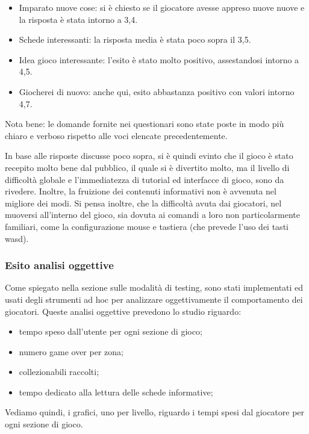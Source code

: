 \begin{itemize}
\item Imparato nuove cose: si è chiesto se il giocatore avesse appreso nuove nuove e la risposta è stata intorno a 3,4.
\item Schede interessanti: la risposta media è stata poco sopra il 3,5.
\item Idea gioco interessante: l'esito è stato molto positivo, assestandosi intorno a 4,5.
\item Giocherei di nuovo: anche qui, esito abbastanza positivo con valori intorno 4,7.

\end{itemize}

Nota bene: le domande fornite nei questionari sono state poste in modo più chiaro e verboso rispetto alle voci elencate precedentemente.

In base alle risposte discusse poco sopra, si è quindi evinto che il gioco è stato recepito molto bene dal pubblico, il quale si è divertito molto, ma il livello di difficoltà globale e l'immediatezza di tutorial ed interfacce di gioco, sono da rivedere. Inoltre, la fruizione dei contenuti informativi non è avvenuta nel migliore dei modi.
Si pensa inoltre, che la difficoltà avuta dai giocatori, nel muoversi all'interno del gioco, sia dovuta ai comandi a loro non particolarmente familiari, come la configurazione mouse e tastiera (che prevede l'uso dei tasti wasd).


\subsubsection{Esito analisi oggettive}

Come spiegato nella sezione sulle modalità di testing, sono stati implementati ed usati degli strumenti ad hoc per analizzare oggettivamente il comportamento dei giocatori.
Queste analisi oggettive prevedono lo studio riguardo:

\begin{itemize}

\item tempo speso dall'utente per ogni sezione di gioco;
\item numero game over per zona;
\item collezionabili raccolti;
\item tempo dedicato alla lettura delle schede informative;

\end {itemize}

Vediamo quindi, i grafici, uno per livello, riguardo i tempi spesi dal giocatore per ogni sezione di gioco.

